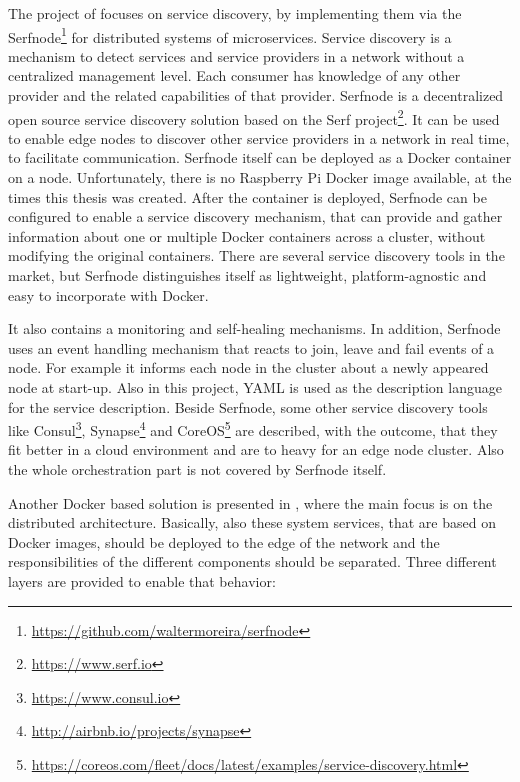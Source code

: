 The project of \autocite{Stubbs:2015} focuses on service discovery, by implementing them via the Serfnode\footnote{\url{https://github.com/waltermoreira/serfnode}} for distributed systems of microservices.
Service discovery is a mechanism to detect services and service providers in a network without a centralized management level.
Each consumer has knowledge of any other provider and the related capabilities of that provider.
Serfnode is a decentralized open source service discovery solution based on the Serf project\footnote{\url{https://www.serf.io}}.
It can be used to enable edge nodes to discover other service providers in a network in real time, to facilitate communication.\autocite[cf.][p. 34]{Stubbs:2015}
Serfnode itself can be deployed as a Docker container on a node.
Unfortunately, there is no Raspberry Pi Docker image available, at the times this thesis was created.
After the container is deployed, Serfnode can be configured to enable a service discovery mechanism, that can provide and gather information about one or multiple Docker containers across a cluster, without modifying the original containers.\autocite[cf.][p. 34]{Stubbs:2015}
There are several service discovery tools in the market, but Serfnode distinguishes itself as lightweight, platform-agnostic and easy to incorporate with Docker.\autocite[cf.][p. 34]{Stubbs:2015}

It also contains a monitoring and self-healing mechanisms.\autocite[cf.][p. 34]{Stubbs:2015}
In addition, Serfnode uses an event handling mechanism that reacts to join, leave and fail events of a node.\autocite[cf.][p. 38]{Stubbs:2015}
For example it informs each node in the cluster about a newly appeared node at start-up.\autocite[cf.][p. 37]{Stubbs:2015}
Also in this project, \ac{YAML} is used as the description language for the service description.
Beside Serfnode, some other service discovery tools like Consul\footnote{\url{https://www.consul.io}}, Synapse\footnote{\url{http://airbnb.io/projects/synapse}} and CoreOS\footnote{\url{https://coreos.com/fleet/docs/latest/examples/service-discovery.html}} are described, with the outcome, that they fit better in a cloud environment and are to heavy for an edge node cluster.\autocite[cf.][p. 36]{Stubbs:2015}
Also the whole orchestration part is not covered by Serfnode itself.

Another Docker based solution is presented in \autocite{Rufino:2017}, where the main focus is on the distributed architecture.
Basically, also these system services, that are based on Docker images, should be deployed to the edge of the network and the responsibilities of the different components should be separated.
Three different layers are provided to enable that behavior:

